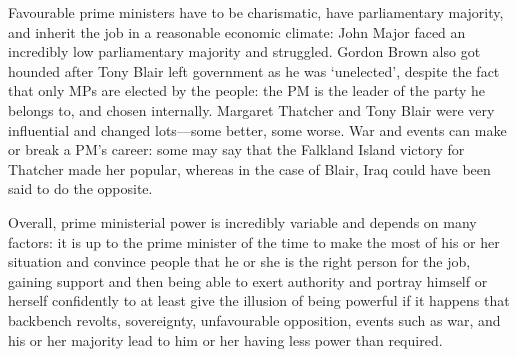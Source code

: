 \documentclass[a4paper]{article}
\begin{document}
Favourable prime ministers have to be charismatic, have parliamentary majority, and inherit the job in a reasonable economic climate: John Major faced an incredibly low parliamentary majority and struggled.  Gordon Brown also got hounded after Tony Blair left government as he was `unelected', despite the fact that only MPs are elected by the people: the PM is the leader of the party he belongs to, and chosen internally.  Margaret Thatcher and Tony Blair were very influential and changed lots---some better, some worse.  War and events can make or break a PM's career: some may say that the Falkland Island victory for Thatcher made her popular, whereas in the case of Blair, Iraq could have been said to do the opposite.

Overall, prime ministerial power is incredibly variable and depends on many factors: it is up to the prime minister of the time to make the most of his or her situation and convince people that he or she is the right person for the job, gaining support and then being able to exert authority and portray himself or herself confidently to at least give the illusion of being powerful if it happens that backbench revolts, sovereignty, unfavourable opposition, events such as war, and his or her majority lead to him or her having less power than required.
\end{document}
